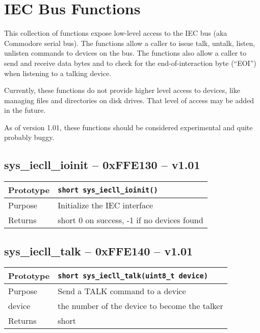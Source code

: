 \section{IEC Bus Functions}
This collection of functions expose low-level access to the IEC bus (aka Commodore serial bus).
The functions allow a caller to issue {\sc talk}, {\sc untalk}, {\sc listen}, {\sc unlisten} commands to devices on the bus.
The functions also allow a caller to send and receive data bytes and to check for the end-of-interaction byte (``EOI'') when
listening to a talking device.

Currently, these functions do not provide higher level access to devices, like managing files and directories on disk drives.
That level of access may be added in the future.

As of version 1.01, these functions should be considered experimental and quite probably buggy.

\subsection*{sys\_iecll\_ioinit -- 0xFFE130 -- v1.01}
\begin{table}[!h]\begin{tabular}{|l||l|} \hline
Prototype & \lstinline!short sys_iecll_ioinit()! \\ \hline
Purpose & Initialize the IEC interface \\ \hline
Returns & short 0 on success, -1 if no devices found \\ \hline
\end{tabular}\end{table}

\subsection*{sys\_iecll\_talk -- 0xFFE140 -- v1.01}
\begin{table}[!h]\begin{tabular}{|l||l|} \hline
Prototype & \lstinline!short sys_iecll_talk(uint8_t device)! \\ \hline
Purpose & Send a TALK command to a device \\ \hline
device & the number of the device to become the talker \\ \hline
Returns & short \\ \hline
\end{tabular}\end{table}

